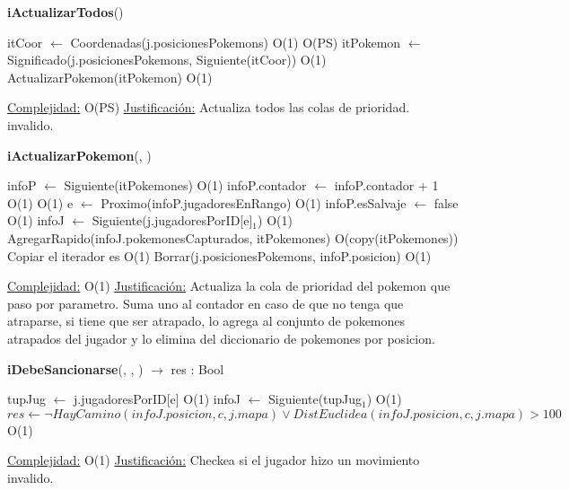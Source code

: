 \begin{algorithm}[H]{\textbf{iActualizarTodos}()} 
	\begin{algorithmic}
		\State itCoor $\gets$ Coordenadas(j.posicionesPokemons)	\Comment O(1)
			\Comment O(PS)
			\State itPokemon $\gets$ Significado(j.posicionesPokemons, Siguiente(itCoor))	\Comment O(1)
				\State ActualizarPokemon(itPokemon)	\Comment O(1)
		\EndWhile

	
		\medskip
		\Statex \underline{Complejidad:} O(PS)
		\Statex \underline{Justificación:} Actualiza todos las colas de prioridad. invalido.
    \end{algorithmic}
\end{algorithm}

\begin{algorithm}[H]{\textbf{iActualizarPokemon}(, )} 
	\begin{algorithmic}
		\State infoP $\gets$ Siguiente(itPokemones)	\Comment O(1)
		\State infoP.contador $\gets$ infoP.contador + 1	\Comment O(1)
    	\Comment O(1)
			\State e $\gets$ Proximo(infoP.jugadoresEnRango)	\Comment O(1)
			\State infoP.esSalvaje $\gets$ false	\Comment O(1)
			\State infoJ $\gets$ Siguiente(j.jugadoresPorID[e]$_{1}$)	\Comment O(1)
			\State AgregarRapido(infoJ.pokemonesCapturados, itPokemones)	\Comment O(copy(itPokemones)) {Copiar el iterador es O(1)}
			\State Borrar(j.posicionesPokemons, infoP.posicion) \Comment O(1)
		\EndIf

	
		\medskip
		\Statex \underline{Complejidad:} O(1)
		\Statex \underline{Justificación:} Actualiza la cola de prioridad del pokemon que paso por parametro. Suma uno al contador en caso de que no tenga que atraparse, si tiene que ser atrapado, lo agrega al conjunto de pokemones atrapados del jugador y lo elimina del diccionario de pokemones por posicion.
    \end{algorithmic}
\end{algorithm}

\begin{algorithm}[H]{\textbf{iDebeSancionarse}(, , ) $\to$ res : Bool} 
	\begin{algorithmic}
    \State tupJug $\gets$ j.jugadoresPorID[e]	\Comment O(1)
  	\State infoJ $\gets$ Siguiente(tupJug$_{1}$)	\Comment O(1)
		\State $res \gets \neg HayCamino(infoJ.posicion, c, j.mapa) \lor DistEuclidea(infoJ.posicion, c, j.mapa) > 100 $ \Comment O(1)
	
		\medskip
		\Statex \underline{Complejidad:} O(1)
		\Statex \underline{Justificación:} Checkea si el jugador hizo un movimiento invalido.
    \end{algorithmic}
\end{algorithm}

